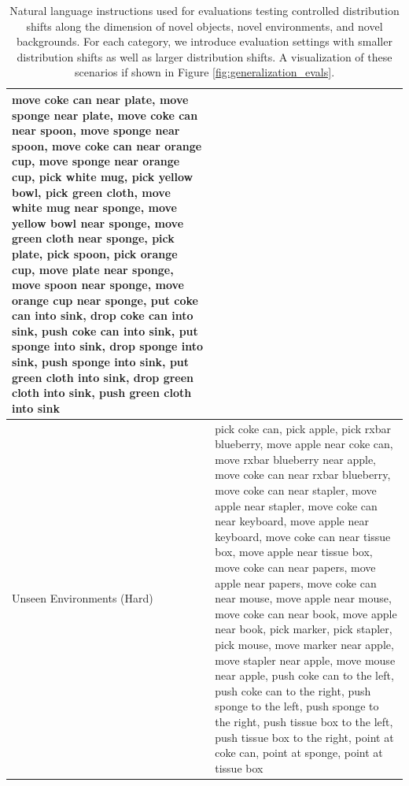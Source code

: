 \begin{table}[ht]
\begin{center}
\begin{tabular}{p{}p{}}
            move coke can near plate,
            move sponge near plate,
            move coke can near spoon,
            move sponge near spoon,
            move coke can near orange cup,
            move sponge near orange cup,
            pick white mug,
            pick yellow bowl,
            pick green cloth,
            move white mug near sponge,
            move yellow bowl near sponge,
            move green cloth near sponge,
            pick plate,
            pick spoon,
            pick orange cup,
            move plate near sponge,
            move spoon near sponge,
            move orange cup near sponge,
            put coke can into sink,
            drop coke can into sink,
            push coke can into sink,
            put sponge into sink,
            drop sponge into sink,
            push sponge into sink,
            put green cloth into sink,
            drop green cloth into sink,
            push green cloth into sink \\
\midrule
Unseen Environments (Hard) & pick coke can, pick apple, pick rxbar blueberry, move apple near coke can, move rxbar blueberry near apple, move coke can near rxbar blueberry, move coke can near stapler, move apple near stapler, move coke can near keyboard, move apple near keyboard, move coke can near tissue box, move apple near tissue box, move coke can near papers, move apple near papers, move coke can near mouse, move apple near mouse, move coke can near book, move apple near book, pick marker, pick stapler, pick mouse, move marker near apple, move stapler near apple, move mouse near apple, push coke can to the left, push coke can to the right, push sponge to the left, push sponge to the right, push tissue box to the left, push tissue box to the right, point at coke can, point at sponge, point at tissue box \\
\bottomrule
\end{tabular}
\caption{Natural language instructions used for evaluations testing controlled distribution shifts along the dimension of novel objects, novel environments, and novel backgrounds. For each category, we introduce evaluation settings with smaller distribution shifts as well as larger distribution shifts. A visualization of these scenarios if shown in Figure \ref{fig:generalization_evals}.}
\label{tab:all_unseen_instructions}
\end{center}
\end{table}

